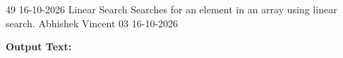 \clearpage
\label{prog:49}
\programhead
  {49}
  {16-10-2026}
  {Linear Search}
  {Searches for an element in an array using linear search.}
  {Abhishek Vincent}
  {03}
  {16-10-2026}

\divider
\textbf{Output Text:}\par
\vspace{2pt}

